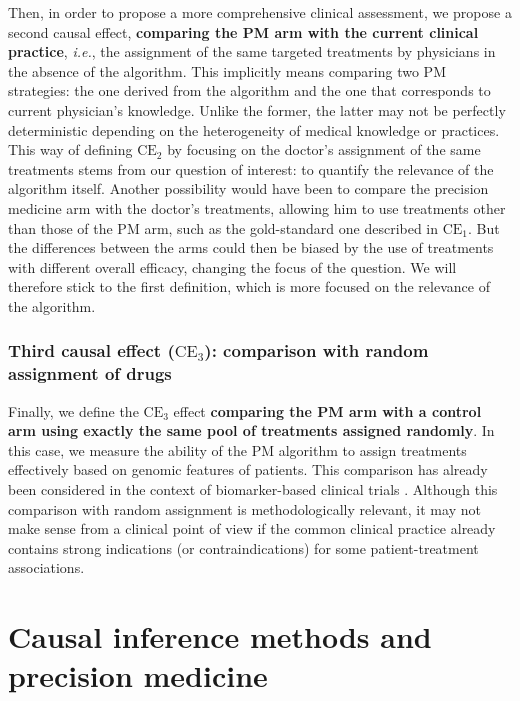 \documentclass[a4paper,12pt,twoside,onecolumn,openright,final,oldfontcommands]{memoir}
\begin{document}
Then, in order to propose a more comprehensive clinical assessment, we
propose a second causal effect, \textbf{comparing the PM arm with the
current clinical practice}, \emph{i.e.}, the assignment of the same
targeted treatments by physicians in the absence of the algorithm. This
implicitly means comparing two PM strategies: the one derived from the
algorithm and the one that corresponds to current physician's knowledge.
Unlike the former, the latter may not be perfectly deterministic
depending on the heterogeneity of medical knowledge or practices. This
way of defining \(\text{CE}_2\) by focusing on the doctor's assignment
of the same treatments stems from our question of interest: to quantify
the relevance of the algorithm itself. Another possibility would have
been to compare the precision medicine arm with the doctor's treatments,
allowing him to use treatments other than those of the PM arm, such as
the gold-standard one described in \(\text{CE}_1\). But the differences
between the arms could then be biased by the use of treatments with
different overall efficacy, changing the focus of the question. We will
therefore stick to the first definition, which is more focused on the
relevance of the algorithm.

\subsubsection{\texorpdfstring{Third causal effect (\(\text{CE}_3\)):
comparison with random assignment of
drugs}{Third causal effect (\textbackslash{}text\{CE\}\_3): comparison with random assignment of drugs}}\label{third-causal-effect-textce_3-comparison-with-random-assignment-of-drugs}

Finally, we define the \(\text{CE}_3\) effect \textbf{comparing the PM
arm with a control arm using exactly the same pool of treatments
assigned randomly}. In this case, we measure the ability of the PM
algorithm to assign treatments effectively based on genomic features of
patients. This comparison has already been considered in the context of
biomarker-based clinical trials \citep{sargent2005clinical}. Although
this comparison with random assignment is methodologically relevant, it
may not make sense from a clinical point of view if the common clinical
practice already contains strong indications (or contraindications) for
some patient-treatment associations.

\section{Causal inference methods and precision
medicine}\label{causal-inference-methods-and-precision-medicine}
\end{document}
